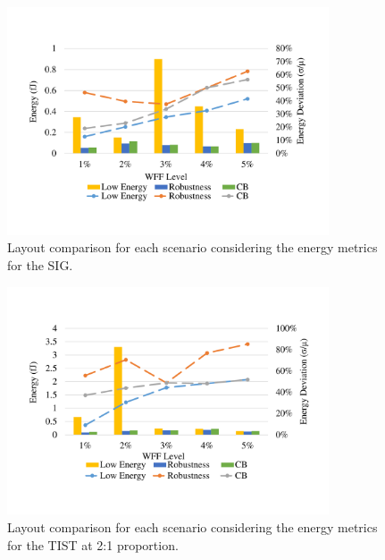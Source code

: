 \documentclass[diss,pgmicro,english]{iiufrgs}
\begin{document}
    \begin{figure}[]
        \centering
            \includegraphics[width=0.85\textwidth, trim={1.25cm 3cm 2cm 3cm}, clip]{comp3Lsig2Energy.pdf}
            \caption{Layout comparison for each scenario considering the energy metrics for the SIG.}
        \label{figscCompSIG}
    \end{figure}

    \begin{figure}[H]
        \centering
            \includegraphics[width=0.85\textwidth, trim={1.25cm 3cm 2cm 3cm}, clip]{comp3Ltist212Energy.pdf}
            \caption{Layout comparison for each scenario considering the energy metrics for the TIST at 2:1 proportion.}
        \label{figscCompTIST21}
    \end{figure}
\end{document}
